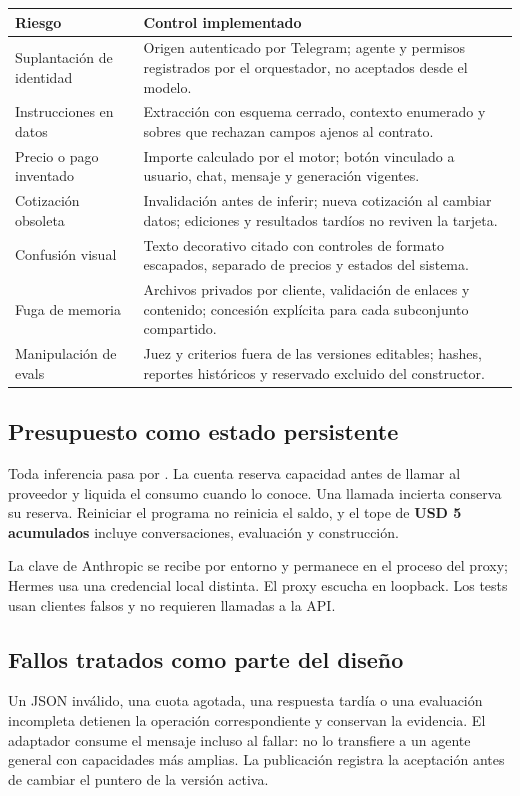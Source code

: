 \documentclass[11pt,a4paper]{article}
\newcommand{\code}[1]{\texttt{\detokenize{#1}}}
\begin{document}
\begin{tabularx}{\linewidth}{@{}P{39mm}Y@{}}
\toprule
\textbf{Riesgo} & \textbf{Control implementado}\\
\midrule
Suplantación de identidad & Origen autenticado por Telegram; agente y permisos registrados por el orquestador, no aceptados desde el modelo.\\
Instrucciones en datos & Extracción con esquema cerrado, contexto enumerado y sobres que rechazan campos ajenos al contrato.\\
Precio o pago inventado & Importe calculado por el motor; botón vinculado a usuario, chat, mensaje y generación vigentes.\\
Cotización obsoleta & Invalidación antes de inferir; nueva cotización al cambiar datos; ediciones y resultados tardíos no reviven la tarjeta.\\
Confusión visual & Texto decorativo citado con controles de formato escapados, separado de precios y estados del sistema.\\
Fuga de memoria & Archivos privados por cliente, validación de enlaces y contenido; concesión explícita para cada subconjunto compartido.\\
Manipulación de evals & Juez y criterios fuera de las versiones editables; hashes, reportes históricos y reservado excluido del constructor.\\
\bottomrule
\end{tabularx}

\subsection{Presupuesto como estado persistente}
Toda inferencia pasa por \code{pasteles/llm.py}. La cuenta reserva capacidad antes
de llamar al proveedor y liquida el consumo cuando lo conoce. Una llamada incierta
conserva su reserva. Reiniciar el programa no reinicia el saldo, y el tope de
\textbf{USD 5 acumulados} incluye conversaciones, evaluación y construcción.

La clave de Anthropic se recibe por entorno y permanece en el proceso del proxy;
Hermes usa una credencial local distinta. El proxy escucha en loopback. Los tests
usan clientes falsos y no requieren llamadas a la API.

\subsection{Fallos tratados como parte del diseño}
Un JSON inválido, una cuota agotada, una respuesta tardía o una evaluación
incompleta detienen la operación correspondiente y conservan la evidencia.
El adaptador consume el mensaje incluso al fallar: no lo transfiere a un agente
general con capacidades más amplias. La publicación registra la aceptación antes
de cambiar el puntero de la versión activa.
\end{document}
